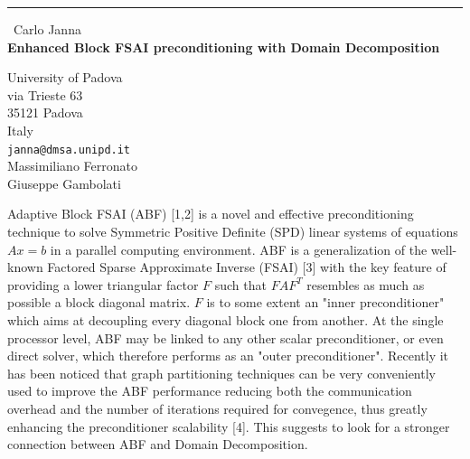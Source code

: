 \documentclass{report}
\begin{document}
\begin{center}
\rule{6in}{1pt} \
{\large Carlo Janna \\
{\bf Enhanced Block FSAI preconditioning with Domain Decomposition}}

University of Padova \\ via Trieste 63 \\ 35121 Padova \\ Italy
\\
{\tt janna@dmsa.unipd.it}\\
Massimiliano Ferronato\\
Giuseppe Gambolati\end{center}

Adaptive Block FSAI (ABF) [1,2] is a novel and effective preconditioning
technique to solve
Symmetric Positive Definite (SPD) linear systems of equations $Ax=b$ in a
parallel computing environment.
ABF is a generalization of the well-known Factored Sparse Approximate
Inverse (FSAI) [3] with
the key feature of providing a lower triangular factor $F$ such that
$FAF^T$ resembles as much as
possible a block diagonal matrix. $F$ is to some extent an "inner
preconditioner" which aims at decoupling
every diagonal block one from another. At the single processor level, ABF
may be linked to any other
scalar preconditioner, or even direct solver, which therefore performs as
an "outer preconditioner".
Recently it has been noticed that graph partitioning techniques can be
very conveniently used
to improve the ABF performance reducing both
the communication overhead and the number of iterations required for
convegence, thus greatly
enhancing the preconditioner scalability [4]. This suggests to look for a
stronger connection between ABF
and Domain Decomposition.
\end{document}
